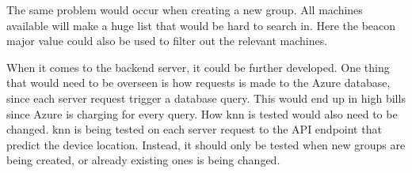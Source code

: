 \bigskip

The same problem would occur when creating a new group.
All machines available will make a huge list that would be hard to search in.
Here the beacon major value could also be used to filter out the relevant machines.

\bigskip

When it comes to the backend server, it could be further developed.
One thing that would need to be overseen is how requests is made to the Azure database, since each server request trigger a database query.
This would end up in high bills since Azure is charging for every query.
How \acrfull{knn} is tested would also need to be changed.
\acrshort{knn} is being tested on each server request to the API endpoint that predict the device location.
Instead, it should only be tested when new groups are being created, or already existing ones is being changed.

